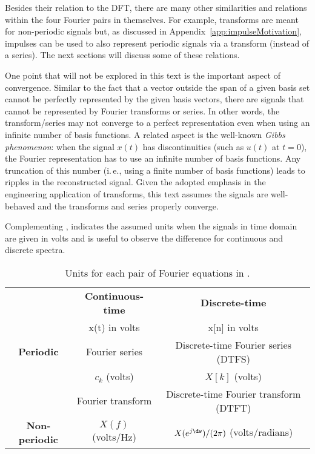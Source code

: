 Besides their relation to the DFT, there are many other similarities and relations within the four Fourier pairs in  themselves. For example, transforms are meant for non-periodic signals but, as discussed in Appendix~\ref{app:impulseMotivation}, impulses can be used to also represent periodic signals via a transform (instead of a series). The next sections will discuss some of these relations.

One point that will not be explored in this text is the important aspect of convergence. Similar to the fact that a vector outside the span of a given basis set cannot be perfectly represented by the given basis vectors, there are signals that cannot be represented by Fourier transforms or series. In other words, the transform/series may not converge to a perfect representation even when using an infinite number of basis functions. A related aspect is the well-known \emph{Gibbs phenomenon}: when the signal $x(t)$ has discontinuities (such as $u(t)$ at $t=0$), the Fourier representation has to use an infinite number of basis functions. Any truncation of this number (i.\,e., using a finite number of basis functions) leads to ripples in the reconstructed signal.
Given the adopted emphasis in the engineering application of transforms, 
this text assumes the signals are well-behaved and the transforms and series properly converge.

Complementing ,  indicates the assumed units when the signals in time domain are given in volts and is useful to observe the difference for continuous and discrete spectra. 

\begin{table}
 \centering
 \caption{Units for each pair of Fourier equations in .\label{tab:fourier_units}}
 \begin{tabularx}{\textwidth}{cCC}
\toprule
 & \textbf{Continuous-time} & \textbf{Discrete-time} \\
 & x(t) in volts & x[n] in volts \\
\midrule
 \textbf{Periodic} & Fourier series & Discrete-time Fourier series (DTFS) \\
 & $c_k$ (volts) & $X[k]$ (volts) \\
 \midrule
 &  Fourier transform & Discrete-time Fourier transform (DTFT) \\
        \textbf{Non-periodic} & $X(f)$ (volts/Hz) & $X(e^{j\dw})/(2 \pi)$ (volts/radians) \\
  \bottomrule
\end{tabularx}
\end{table}

